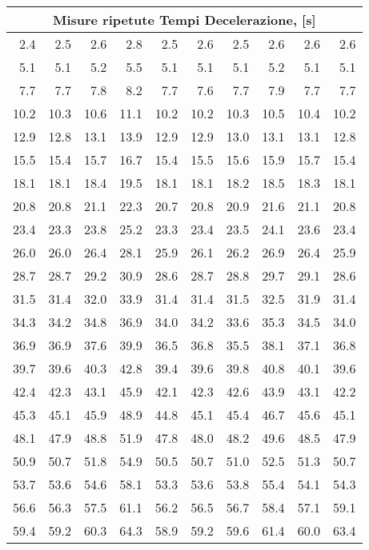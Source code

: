 \begin{tabular}{r r r r r r r r r r}
\hline
\multicolumn{ 10}{|c|}{Misure ripetute Tempi Decelerazione, \pm 0.1  [s]} \\ \hline
2.4 & 2.5 & 2.6 & 2.8 & 2.5 & 2.6 & 2.5 & 2.6 & 2.6 & 2.6 \\ \hline
5.1 & 5.1 & 5.2 & 5.5 & 5.1 & 5.1 & 5.1 & 5.2 & 5.1 & 5.1 \\ \hline
7.7 & 7.7 & 7.8 & 8.2 & 7.7 & 7.6 & 7.7 & 7.9 & 7.7 & 7.7 \\ \hline
10.2 & 10.3 & 10.6 & 11.1 & 10.2 & 10.2 & 10.3 & 10.5 & 10.4 & 10.2 \\ \hline
12.9 & 12.8 & 13.1 & 13.9 & 12.9 & 12.9 & 13.0 & 13.1 & 13.1 & 12.8 \\ \hline
15.5 & 15.4 & 15.7 & 16.7 & 15.4 & 15.5 & 15.6 & 15.9 & 15.7 & 15.4 \\ \hline
18.1 & 18.1 & 18.4 & 19.5 & 18.1 & 18.1 & 18.2 & 18.5 & 18.3 & 18.1 \\ \hline
20.8 & 20.8 & 21.1 & 22.3 & 20.7 & 20.8 & 20.9 & 21.6 & 21.1 & 20.8 \\ \hline
23.4 & 23.3 & 23.8 & 25.2 & 23.3 & 23.4 & 23.5 & 24.1 & 23.6 & 23.4 \\ \hline
26.0 & 26.0 & 26.4 & 28.1 & 25.9 & 26.1 & 26.2 & 26.9 & 26.4 & 25.9 \\ \hline
28.7 & 28.7 & 29.2 & 30.9 & 28.6 & 28.7 & 28.8 & 29.7 & 29.1 & 28.6 \\ \hline
31.5 & 31.4 & 32.0 & 33.9 & 31.4 & 31.4 & 31.5 & 32.5 & 31.9 & 31.4 \\ \hline
34.3 & 34.2 & 34.8 & 36.9 & 34.0 & 34.2 & 33.6 & 35.3 & 34.5 & 34.0 \\ \hline
36.9 & 36.9 & 37.6 & 39.9 & 36.5 & 36.8 & 35.5 & 38.1 & 37.1 & 36.8 \\ \hline
39.7 & 39.6 & 40.3 & 42.8 & 39.4 & 39.6 & 39.8 & 40.8 & 40.1 & 39.6 \\ \hline
42.4 & 42.3 & 43.1 & 45.9 & 42.1 & 42.3 & 42.6 & 43.9 & 43.1 & 42.2 \\ \hline
45.3 & 45.1 & 45.9 & 48.9 & 44.8 & 45.1 & 45.4 & 46.7 & 45.6 & 45.1 \\ \hline
48.1 & 47.9 & 48.8 & 51.9 & 47.8 & 48.0 & 48.2 & 49.6 & 48.5 & 47.9 \\ \hline
50.9 & 50.7 & 51.8 & 54.9 & 50.5 & 50.7 & 51.0 & 52.5 & 51.3 & 50.7 \\ \hline
53.7 & 53.6 & 54.6 & 58.1 & 53.3 & 53.6 & 53.8 & 55.4 & 54.1 & 54.3 \\ \hline
56.6 & 56.3 & 57.5 & 61.1 & 56.2 & 56.5 & 56.7 & 58.4 & 57.1 & 59.1 \\ \hline
59.4 & 59.2 & 60.3 & 64.3 & 58.9 & 59.2 & 59.6 & 61.4 & 60.0 & 63.4 \\ \hline
\end{tabular}

